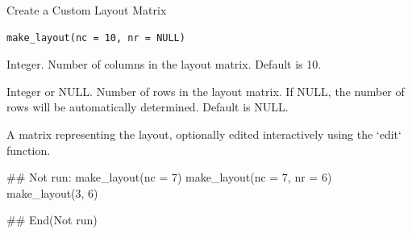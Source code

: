 \documentclass[a4paper]{book}
\begin{document}
%
\begin{Description}
Create a Custom Layout Matrix
\end{Description}
%
\begin{Usage}
\begin{verbatim}
make_layout(nc = 10, nr = NULL)
\end{verbatim}
\end{Usage}
%
\begin{Arguments}
\begin{ldescription}
\item[\code{nc}] Integer. Number of columns in the layout matrix. Default is 10.

\item[\code{nr}] Integer or NULL. Number of rows in the layout matrix. If NULL, the number of rows will be automatically determined. Default is NULL.
\end{ldescription}
\end{Arguments}
%
\begin{Value}
A matrix representing the layout, optionally edited interactively using the `edit` function.
\end{Value}
%
\begin{Examples}
\begin{ExampleCode}
\#\# Not run: 
make_layout(nc = 7)
make_layout(nc = 7, nr = 6)
make_layout(3, 6)

## End(Not run)
\end{ExampleCode}
\end{Examples}
\end{document}
